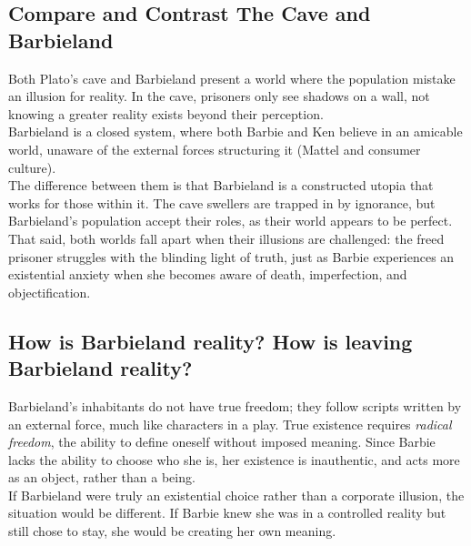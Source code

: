
\subsection{Compare and Contrast The Cave and Barbieland}

Both Plato's cave and Barbieland present a world where the population
mistake an illusion for reality. In the cave, prisoners only see shadows on a wall,
not knowing a greater reality exists beyond their perception. \\

Barbieland is a closed system, where both Barbie and Ken believe in an 
amicable world, unaware of the external forces structuring it (Mattel and consumer culture). \\

The difference between them is that Barbieland is a constructed utopia that works for those within it.
The cave swellers are trapped in by ignorance, but Barbieland's population accept their roles, as their world 
appears to be perfect. \\

That said, both worlds fall apart when their illusions are challenged: the freed prisoner struggles with
the blinding light of truth, just as Barbie experiences an existential anxiety when she becomes aware of death,
imperfection, and objectification. \\

\subsection{How is Barbieland reality? How is leaving Barbieland reality?}

Barbieland’s inhabitants do not have true freedom; they follow scripts 
written by an external force, much like characters in a play. 
True existence requires \textit{radical freedom}, the ability to define oneself 
without imposed meaning. Since Barbie lacks the ability to choose who she is, 
her existence is inauthentic, and acts more as an object, rather than a being. \\ 

If Barbieland were truly an existential choice rather than a corporate illusion, 
the situation would be different. If Barbie knew she was in a controlled reality 
but still chose to stay, she would be creating her own meaning. \\ 

